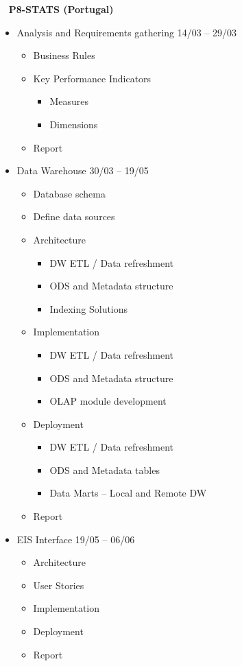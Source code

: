 \ \newline
\textbf{P8-STATS (Portugal)} 
\begin{itemize}
\item Analysis and Requirements gathering	\hfill14/03 – 29/03
	\begin{itemize}
	  \item Business Rules
	  \item Key Performance Indicators
	  	\begin{itemize}
	  		\item Measures
			\item Dimensions
		\end{itemize}
	   \item Report
	\end{itemize}
\item Data Warehouse		\hfill30/03 – 19/05
	\begin{itemize}
		\item Database schema
		\item Define data sources
		\item Architecture
		\begin{itemize}
		  \item DW ETL / Data refreshment
		  \item ODS and Metadata structure
		  \item Indexing Solutions
		\end{itemize}
		\item Implementation
		\begin{itemize}
		  \item DW ETL / Data refreshment
		  \item ODS and Metadata structure
		  \item OLAP module development
		\end{itemize}
		\item Deployment
		\begin{itemize}
		  \item DW ETL / Data refreshment
		  \item ODS and Metadata tables
		  \item Data Marts – Local and Remote DW
		\end{itemize}
		\item Report
	\end{itemize}
\item EIS Interface	\hfill19/05 – 06/06
	\begin{itemize}
	 	\item Architecture
		\item User Stories
		\item Implementation
		\item Deployment
		\item Report
	\end{itemize}
\end{itemize}

